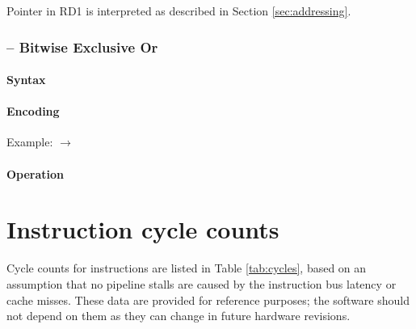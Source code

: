 \documentclass[a4paper,12pt,twoside,extrafontsizes]{memoir}
\begin{document}
{

Pointer in RD1 is interpreted as described in Section \ref{sec:addressing}.

\subsection{ -- Bitwise Exclusive Or}
\label{subsec:instr:xor}

\subsubsection{Syntax}


\subsubsection{Encoding}


Example:  $\rightarrow$ 

\subsubsection{Operation}


}


\chapter{Instruction cycle counts}

Cycle counts for \lxp{} instructions are listed in Table \ref{tab:cycles}, based on an assumption that no pipeline stalls are caused by the instruction bus latency or cache misses. These data are provided for reference purposes; the software should not depend on them as they can change in future hardware revisions.
\end{document}
